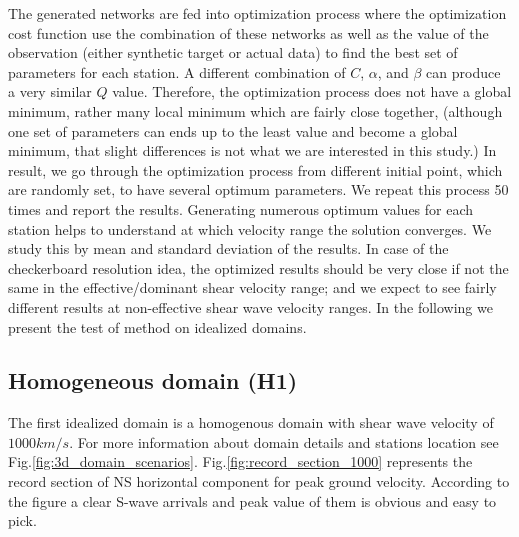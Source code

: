 

The generated networks are fed into optimization process where the optimization cost function use the combination of these networks as well as the value of the observation (either synthetic target or actual data) to find the best set of parameters for each station.  A different combination of $C$, $\alpha$, and $\beta$ can produce a very similar $Q$ value. Therefore, the optimization process does not have a global minimum, rather many local minimum which are fairly close together, (although one set of parameters can ends up to the least value and become a global minimum, that slight differences is not what we are interested in this study.) In result, we go through the optimization process from different initial point, which are randomly set, to have several optimum parameters. We repeat this process 50 times and report the results. Generating numerous optimum values for each station helps to understand at which velocity range the solution converges. We study this by mean and standard deviation of the results. In case of the checkerboard resolution idea, the optimized results should be very close if not the same in the effective/dominant shear velocity range; and we expect to see fairly different results at non-effective shear wave velocity ranges. In the following we present the test of method on idealized domains. 

\subsection{Homogeneous domain (H1)}

The first idealized domain is a homogenous domain with shear wave velocity of $1000 km/s$. For more information about domain details and stations location see Fig.\ref{fig:3d_domain_scenarios}. Fig.\ref{fig:record_section_1000} represents the record section of NS horizontal component for peak ground velocity. According to the figure a clear S-wave arrivals and peak value of them is obvious and easy to pick.

